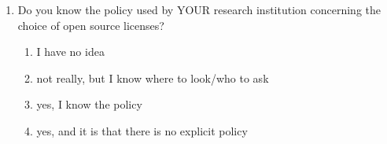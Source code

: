 \documentclass{article}\usepackage[]{graphicx}\usepackage[]{color}
\begin{document}
\begin{enumerate}
\item Do you know the policy used by YOUR research institution
concerning the choice of open source licenses?
\begin{enumerate}
\item I have no idea
\item not really, but I know where to look/who to ask
\item yes, I know the policy
\item yes, and it is that there is no explicit policy
\end{enumerate}
\end{enumerate}
\end{document}
